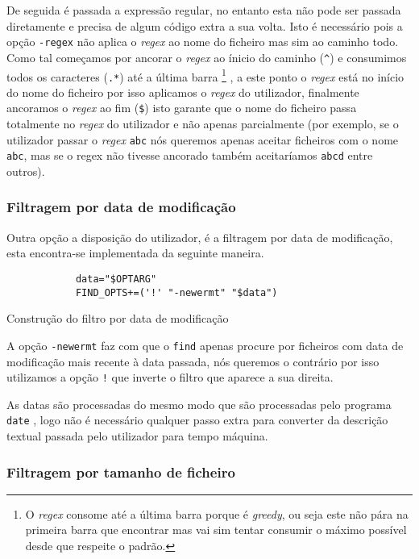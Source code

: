 De seguida é passada a expressão regular, no entanto esta não pode ser passada
diretamente e precisa de algum código extra a sua volta. Isto é necessário pois
a opção \Verb|-regex| não aplica o \emph{regex} ao nome do ficheiro mas sim ao
caminho todo. Como tal começamos por ancorar o \emph{regex} ao ínicio do caminho
(\Verb|^|) e consumimos todos os caracteres (\Verb|.*|) até a última barra
\footnote{O \emph{regex} consome até a última barra porque é \emph{greedy}, ou
	seja este não pára na primeira barra que encontrar mas vai sim tentar consumir
	o máximo possível desde que respeite o padrão.}
, a este ponto o \emph{regex} está no início do nome do ficheiro por isso
aplicamos o \emph{regex} do utilizador, finalmente ancoramos o \emph{regex} ao
fim (\Verb|$|) isto garante que o nome do ficheiro passa totalmente no
\emph{regex} do utilizador e não apenas parcialmente (por exemplo, se o
utilizador passar o \emph{regex} \Verb|abc| nós queremos apenas aceitar
ficheiros com o nome \Verb|abc|, mas se o regex não tivesse ancorado também
aceitaríamos \Verb|abcd| entre outros).

\subsubsection{Filtragem por data de modificação}

Outra opção a disposição do utilizador, é a filtragem por data de modificação,
esta encontra-se implementada da seguinte maneira.

\begin{listing}[H]
	\centering
	\begin{verbatim}
			data="$OPTARG"
			FIND_OPTS+=('!' "-newermt" "$data")
  \end{verbatim}
	\caption{Construção do filtro por data de modificação}
\end{listing}

A opção \Verb|-newermt| faz com que o \Verb|find| apenas procure por ficheiros
com data de modificação mais recente à data passada, nós queremos o contrário por
isso utilizamos a opção \Verb|!| que inverte o filtro que aparece a sua direita.

As datas são processadas do mesmo modo que são processadas pelo programa
\Verb|date| \cite{find_man}, logo não é necessário qualquer passo extra para
converter da descrição textual passada pelo utilizador para tempo máquina.

\subsubsection{Filtragem por tamanho de ficheiro}

